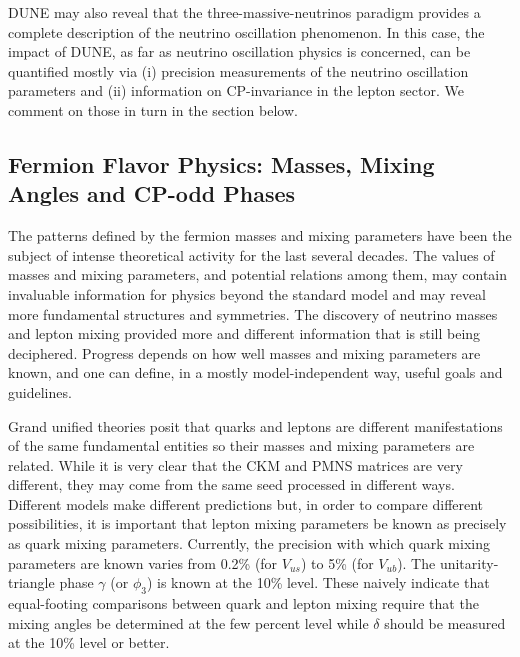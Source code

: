 DUNE may also reveal that the three-massive-neutrinos paradigm provides a complete description of the neutrino oscillation phenomenon. In this case, the impact of DUNE, as far as neutrino oscillation physics is concerned, can be quantified mostly via (i) precision measurements of the neutrino oscillation parameters and (ii) information on CP-invariance in the lepton sector. We comment on those in turn in the section below.


\subsection{Fermion Flavor Physics: Masses, Mixing Angles 
   and CP-odd Phases}

The patterns defined by the fermion masses and mixing parameters have been the subject of intense theoretical activity for the last several decades. The values of masses and mixing parameters, and potential relations among them, may contain invaluable information for physics beyond the standard model and may reveal more fundamental structures and symmetries. The discovery of neutrino masses and lepton mixing provided more and different information that is still being deciphered. Progress depends on how well masses and mixing parameters are known, and one can define, in a mostly model-independent way, useful goals and guidelines. 

Grand unified theories posit that quarks and leptons are different manifestations of the same fundamental entities so their masses and mixing parameters are related. While it is very clear that the CKM and PMNS matrices are very different, they may come from the same seed processed in different ways. Different models make different predictions but, in order to compare different possibilities, it is important that lepton mixing parameters be known as precisely as quark mixing parameters. Currently, the precision with which quark mixing parameters are known \cite{Tanabashi:2018oca} varies from 0.2\% (for $V_{us}$) to 5\% (for $V_{ub}$). The unitarity-triangle phase $\gamma$ (or $\phi_3$) is known at the 10\% level. These naively indicate that equal-footing comparisons between quark and lepton mixing require that the mixing angles be determined at the few percent level while $\delta$ should be measured at the 10\% level or better.

